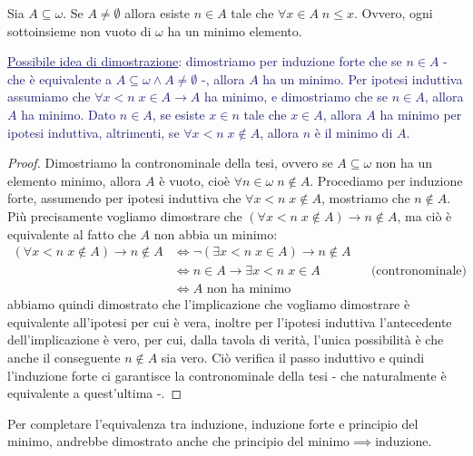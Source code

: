 \begin{theorem}
	Sia $A \subseteq \omega$. Se $A \ne \emptyset$ allora esiste $n \in A$ tale che $\forall x \in A \; n \leq x$. Ovvero, ogni sottoinsieme non vuoto di $\omega$ ha un minimo elemento.
\end{theorem}

\textcolor{MidnightBlue}{\underline{Possibile idea di dimostrazione}: dimostriamo per induzione forte che se $n \in A$ - che è equivalente a $A\subseteq \omega \land A \ne \emptyset$ -, allora $A$ ha un minimo. Per ipotesi induttiva assumiamo che $\forall x < n \; x \in A \to A$ ha minimo, e dimostriamo che se $n \in A$, allora 
$A$ ha minimo. Dato $n \in A$, se esiste $x \in n$ tale che $x \in A$, allora $A$ ha minimo per ipotesi induttiva, altrimenti, se $\forall x < n \; x \not \in A$, allora $n$ è il minimo di $A$.}

\begin{proof}
	Dimostriamo la contronominale della tesi, ovvero se $A \subseteq \omega$ non ha un elemento minimo, allora $A$ è vuoto, cioè $\forall n \in \omega \; n \not \in A$. Procediamo per induzione forte, assumendo per ipotesi induttiva che $\forall x < n \; x \not \in A$, mostriamo che $n \not \in A$.
	Più precisamente vogliamo dimostrare che $(\forall x < n \; x \not \in A) \to n \not \in A$, ma ciò è equivalente al fatto che $A$ non abbia un minimo:
	\begin{align*}
		(\forall x < n \; x \not \in A) \to n \not \in A &\iff \neg(\exists x < n \; x \in A) \to n \not \in A \\
														 &\iff n \in A \to \exists x < n \; x \in A &&\text{(contronominale)}\\
														 &\iff \text{$A$ non ha minimo}
	\end{align*}
	abbiamo quindi dimostrato che l'implicazione che vogliamo dimostrare è equivalente all'ipotesi per cui è vera, inoltre per l'ipotesi induttiva l'antecedente dell'implicazione è vero, per cui, dalla tavola di verità,
	l'unica possibilità è che anche il conseguente $n \not \in A$ sia vero. Ciò verifica il passo induttivo e quindi l'induzione forte ci garantisce la contronominale della tesi - che naturalmente è equivalente a quest'ultima -.
\end{proof}

\begin{remark}
	Per completare l'equivalenza tra induzione, induzione forte e principio del minimo, andrebbe dimostrato anche che principio del minimo$\implies$induzione.
\end{remark}

